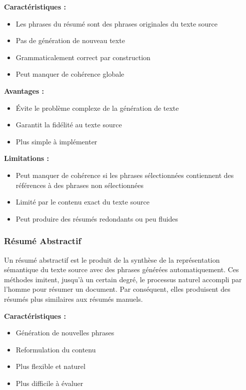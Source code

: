 \textbf{Caractéristiques :}
\begin{itemize}
    \item Les phrases du résumé sont des phrases originales du texte source
    \item Pas de génération de nouveau texte
    \item Grammaticalement correct par construction
    \item Peut manquer de cohérence globale
\end{itemize}

\textbf{Avantages :}
\begin{itemize}
    \item Évite le problème complexe de la génération de texte
    \item Garantit la fidélité au texte source
    \item Plus simple à implémenter
\end{itemize}

\textbf{Limitations :}
\begin{itemize}
    \item Peut manquer de cohérence si les phrases sélectionnées contiennent des références à des phrases non sélectionnées
    \item Limité par le contenu exact du texte source
    \item Peut produire des résumés redondants ou peu fluides
\end{itemize}

\subsubsection{Résumé Abstractif}

Un résumé abstractif est le produit de la synthèse de la représentation sémantique du texte source avec des phrases générées automatiquement. Ces méthodes imitent, jusqu'à un certain degré, le processus naturel accompli par l'homme pour résumer un document. Par conséquent, elles produisent des résumés plus similaires aux résumés manuels.

\textbf{Caractéristiques :}
\begin{itemize}
    \item Génération de nouvelles phrases
    \item Reformulation du contenu
    \item Plus flexible et naturel
    \item Plus difficile à évaluer
\end{itemize}

